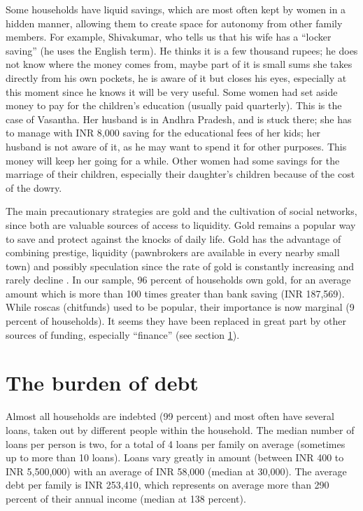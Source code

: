 \documentclass[a4paper, 11pt, onecolumn]{article}
\begin{document}
Some households have liquid savings, which are most often kept by women in a hidden manner, allowing them to create space for autonomy from other family members. 
For example, Shivakumar, who tells us that his wife has a ``locker saving'' (he uses the English term). 
He thinks it is a few thousand rupees; he does not know where the money comes from, maybe part of it is small sums she takes directly from his own pockets, he is aware of it but closes his eyes, especially at this moment since he knows it will be very useful. 
Some women had set aside money to pay for the children's education (usually paid quarterly). 
This is the case of Vasantha. 
Her husband is in Andhra Pradesh, and is stuck there; she has to manage with INR 8,000 saving for the educational fees of her kids; her husband is not aware of it, as he may want to spend it for other purposes. 
This money will keep her going for a while. 
Other women had some savings for the marriage of their children, especially their daughter's children because of the cost of the dowry. 

The main precautionary strategies are gold and the cultivation of social networks, since both are valuable sources of access to liquidity. 
Gold remains a popular way to save and protect against the knocks of daily life. 
Gold has the advantage of combining prestige, liquidity (pawnbrokers are available in every nearby small town) and possibly speculation since the rate of gold is constantly increasing and rarely decline \citep{Goedecke2017}. 
In our sample, 96 percent of households own gold, for an average amount which is more than 100 times greater than bank saving (INR 187,569). 
While roscas (chitfunds) used to be popular, their importance is now marginal (9 percent of households). 
It seems they have been replaced in great part by other sources of funding, especially ``finance'' (see section \ref{section:burden}). 

\section{The burden of debt}
\label{section:burden}

Almost all households are indebted (99 percent) and most often have several loans, taken out by different people within the household.
The median number of loans per person is two, for a total of 4 loans per family on average (sometimes up to more than 10 loans). 
Loans vary greatly in amount (between INR 400 to INR 5,500,000) with an average of INR 58,000 (median at 30,000). 
The average debt per family is INR 253,410, which represents on average more than 290 percent of their annual income (median at 138 percent).
\end{document}
